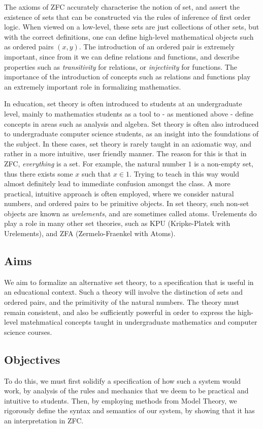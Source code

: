 \documentclass[12pt]{article}
\begin{document}
The axioms of ZFC accurately characterise the notion of set, and assert the existence of sets that can be constructed via the rules of inference of first order logic. When viewed on a low-level, these sets are just collections of other sets, but with the correct definitions, one can define high-level mathematical objects such as ordered pairs $(x,y)$. The introduction of an ordered pair is extremely important, since from it we can define relations and functions, and describe properties such as \emph{transitivity} for relations, or \emph{injectivity} for functions. The importance of the  introduction of concepts such as relations and functions play an extremely important role in formalizing mathematics.

In education, set theory is often introduced to students at an undergraduate level, mainly to mathematics students as a tool to - as mentioned above - define concepts in areas such as analysis and algebra. Set theory is often also introduced to undergraduate computer science students, as an insight into the foundations of the subject. In these cases, set theory is rarely taught in an axiomatic way, and rather in a more intuitive, user friendly manner. The reason for this is that in ZFC, \emph{everything} is a set. For example, the natural number $1$ is a non-empty set, thus there exists some $x$ such that $x\in 1$. Trying to teach in this way would almost definitely lead to immediate confusion amongst the class. A more practical, intuitive approach is often employed, where we consider natural numbers, and ordered pairs to be primitive objects. In set theory, such non-set objects are known as \emph{urelements}, and are sometimes called atoms. Urelements do play a role in many other set theories, such as KPU (Kripke-Platek with Urelements), and ZFA (Zermelo-Fraenkel with Atoms).

\subsection{Aims}
We aim to formalize an alternative set theory, to a specification that is useful in an educational context. Such a theory will involve the distinction of sets and ordered pairs, and the primitivity of the natural numbers. The theory must remain consistent, and also be sufficiently powerful in order to express the high-level matehmatical concepts taught in undergraduate mathematics and computer science courses.

\subsection{Objectives}
To do this, we must first solidify a specification of how such a system would work, by analysis of the rules and mechanics that we deem to be practical and intuitive to students. Then, by employing methods from Model Theory, we rigorously define the syntax and semantics of our system, by showing that it has an interpretation in ZFC.
\end{document}
